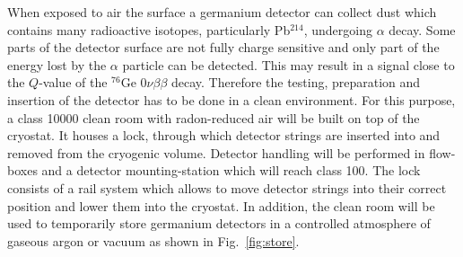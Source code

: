 When exposed to air the surface a germanium detector can collect dust
which contains many radioactive isotopes, particularly Pb$^{214}$,
undergoing $\alpha$ decay. Some parts of the detector surface are not
fully charge sensitive and only part of the energy lost by the
$\alpha$ particle can be detected. This may result in a signal close
to the $Q$-value of the $^{76}$Ge $0\nu\beta\beta$ decay. Therefore
the testing, preparation and insertion of the detector has to be done
in a clean environment. For this purpose, a class 10000 clean room
with radon-reduced air will be built on top of the cryostat. It houses
a lock, through which detector strings are inserted into and removed
from the cryogenic volume. Detector handling will be performed in
flow-boxes and a detector mounting-station which will reach class 100.
The lock consists of a rail system which allows to move detector
strings into their correct position and lower them into the
cryostat. In addition, the clean room will be used to temporarily
store germanium detectors in a controlled atmosphere of gaseous argon
or vacuum as shown in Fig.~\ref{fig:store}.

